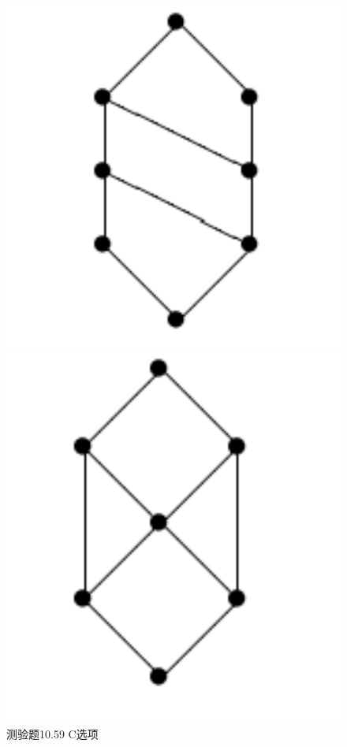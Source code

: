 \documentclass[UTF8, heading=true]{ctexart}
\begin{document}
\begin{figure}[H]
  \centering
  \begin{minipage}[t]{0.2\textwidth}
      \centering
      \includegraphics[width=1\textwidth]{10.59_3.jpg} %
      \vspace{-0.3cm}
      \caption{测验题10.59 C选项}
  \end{minipage}
  \hspace{0.22\textwidth} %
  \begin{minipage}[t]{0.2\textwidth}
      \centering
      \includegraphics[width=1\textwidth]{10.59_4.jpg} %

\end{minipage}
\end{figure}
\end{document}
